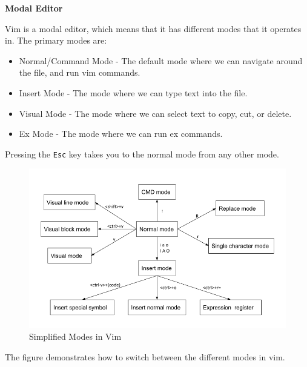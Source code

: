 \textbf{Modal Editor}


Vim is a modal editor, which means that it has different modes
that it operates in. The primary modes are:

\begin{itemize}
  \item Normal/Command Mode - The default mode where we can navigate
    around the file, and run vim commands.
  \item Insert Mode - The mode where we can type text into the file.
  \item Visual Mode - The mode where we can select text to copy, cut, or delete.
  \item Ex Mode - The mode where we can run ex commands.
\end{itemize}

Pressing the \texttt{Esc} key takes you to the normal mode
from any other mode.

\begin{figure}[h!]
  \includegraphics{images/png/vimmodes.png}
  \caption{Simplified Modes in Vim}
\end{figure}

The figure  demonstrates how to switch between
the different modes in vim.

